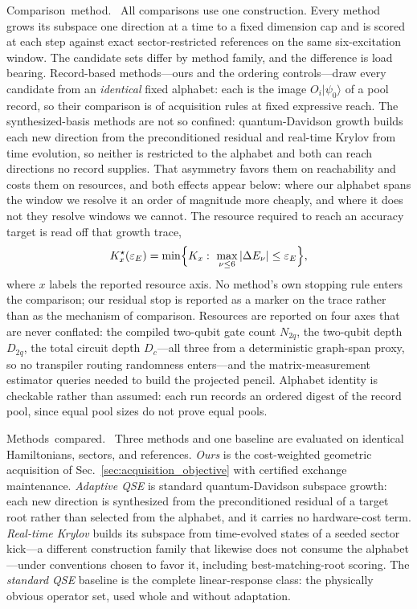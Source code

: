 \documentclass[
  reprint,
  amsmath,
  amssymb,
  aps,
  pra,
  nofootinbib,
  superscriptaddress,
  floatfix
]{revtex4-2}
\newcommand{\tentative}[1]{\textcolor{red!70!black}{#1}}
\newcommand{\structlabel}[1]{\noindent\mbox{\tentative{#1.}}~}
\newcommand{\eps}{\varepsilon}
\newcommand{\ket}[1]{|#1\rangle}
\begin{document}
\structlabel{Comparison method}
All comparisons use one construction.  Every method grows its subspace one direction at a time to a fixed dimension cap and is scored at each step against exact sector-restricted references on the same six-excitation window.  The candidate sets differ by method family, and the difference is load bearing.  Record-based methods---ours and the ordering controls---draw every candidate from an \emph{identical} fixed alphabet: each is the image $O_i\ket{\psi_0}$ of a pool record, so their comparison is of acquisition rules at fixed expressive reach.  The synthesized-basis methods are not so confined: quantum-Davidson growth builds each new direction from the preconditioned residual and real-time Krylov from time evolution, so neither is restricted to the alphabet and both can reach directions no record supplies.  That asymmetry favors them on reachability and costs them on resources, and both effects appear below: where our alphabet spans the window we resolve it an order of magnitude more cheaply, and where it does not they resolve windows we cannot.  The resource required to reach an accuracy target is read off that growth trace,
\begin{equation}
K_x^\star(\eps_E)=\min\Bigl\{K_x:\ \max_{\nu\le 6}|\Delta E_\nu|\le\eps_E\Bigr\},
\label{eq:qse_kstar}
\end{equation}
where $x$ labels the reported resource axis.  No method's own stopping rule enters the comparison; our residual stop is reported as a marker on the trace rather than as the mechanism of comparison.  Resources are reported on four axes that are never conflated: the compiled two-qubit gate count $N_{2q}$, the two-qubit depth $D_{2q}$, the total circuit depth $D_c$---all three from a deterministic graph-span proxy, so no transpiler routing randomness enters---and the matrix-measurement estimator queries needed to build the projected pencil.  Alphabet identity is checkable rather than assumed: each run records an ordered digest of the record pool, since equal pool sizes do not prove equal pools.

\structlabel{Methods compared}
Three methods and one baseline are evaluated on identical Hamiltonians, sectors, and references.  \emph{Ours} is the cost-weighted geometric acquisition of Sec.~\ref{sec:acquisition_objective} with certified exchange maintenance.  \emph{Adaptive QSE} is standard quantum-Davidson subspace growth: each new direction is synthesized from the preconditioned residual of a target root rather than selected from the alphabet, and it carries no hardware-cost term.  \emph{Real-time Krylov} builds its subspace from time-evolved states of a seeded sector kick---a different construction family that likewise does not consume the alphabet---under conventions chosen to favor it, including best-matching-root scoring.  The \emph{standard QSE} baseline is the complete linear-response class: the physically obvious operator set, used whole and without adaptation.
\end{document}
